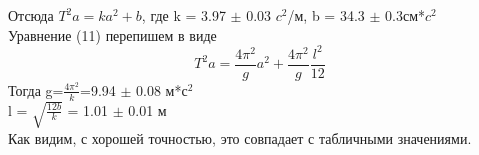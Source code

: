 \documentclass[12pt]{article}
\begin{document}
     Отсюда $T^2a = ka^2+b$, где k = 3.97 $\pm$ 0.03 $c^2$/м, b = 34.3 $\pm$ 0.3см*$c^2$ \\
     
     Уравнение (11) перепишем в виде $$T^2a=\frac{4\pi^2}{g}a^2+\frac{4\pi^2}{g}\frac{l^2}{12}$$
     Тогда g=$\frac{4\pi^2}{k}$=9.94 $\pm$ 0.08 м*$с^2$ \\
     l = $\sqrt{\frac{12b}{k}}$ = 1.01 $\pm$ 0.01 м \\
     Как видим, с хорошей точностью, это совпадает с табличными значениями.
       
\end{document}
